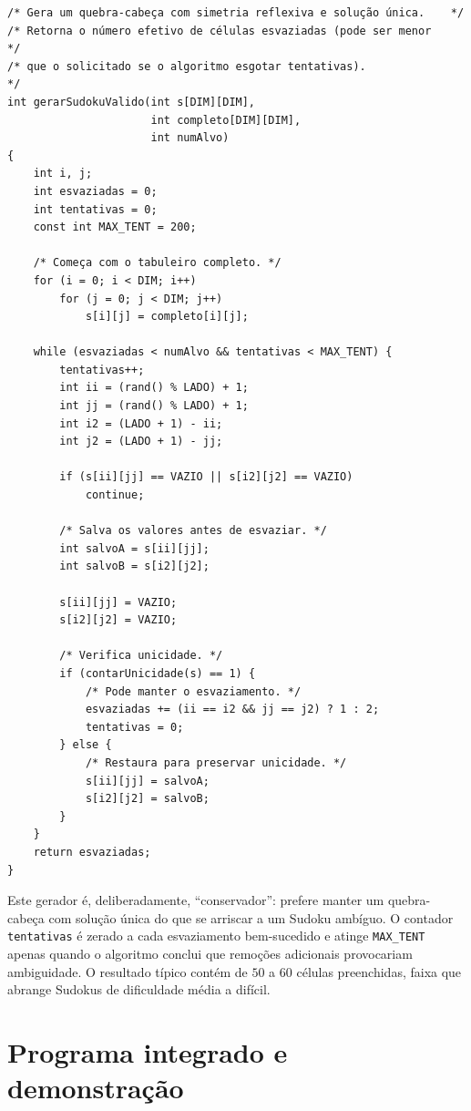\documentclass[11pt,a4paper,oneside]{report}
\newcommand{\codigo}[1]{\texttt{\color{deitelblue}#1}}
\begin{document}
\begin{lstlisting}[caption={Gerador de Sudokus com solução única garantida.},label={lst:gerador_unico}]
/* Gera um quebra-cabeça com simetria reflexiva e solução única.    */
/* Retorna o número efetivo de células esvaziadas (pode ser menor    */
/* que o solicitado se o algoritmo esgotar tentativas).               */
int gerarSudokuValido(int s[DIM][DIM],
                      int completo[DIM][DIM],
                      int numAlvo)
{
    int i, j;
    int esvaziadas = 0;
    int tentativas = 0;
    const int MAX_TENT = 200;

    /* Começa com o tabuleiro completo. */
    for (i = 0; i < DIM; i++)
        for (j = 0; j < DIM; j++)
            s[i][j] = completo[i][j];

    while (esvaziadas < numAlvo && tentativas < MAX_TENT) {
        tentativas++;
        int ii = (rand() % LADO) + 1;
        int jj = (rand() % LADO) + 1;
        int i2 = (LADO + 1) - ii;
        int j2 = (LADO + 1) - jj;

        if (s[ii][jj] == VAZIO || s[i2][j2] == VAZIO)
            continue;

        /* Salva os valores antes de esvaziar. */
        int salvoA = s[ii][jj];
        int salvoB = s[i2][j2];

        s[ii][jj] = VAZIO;
        s[i2][j2] = VAZIO;

        /* Verifica unicidade. */
        if (contarUnicidade(s) == 1) {
            /* Pode manter o esvaziamento. */
            esvaziadas += (ii == i2 && jj == j2) ? 1 : 2;
            tentativas = 0;
        } else {
            /* Restaura para preservar unicidade. */
            s[ii][jj] = salvoA;
            s[i2][j2] = salvoB;
        }
    }
    return esvaziadas;
}
\end{lstlisting}

\begin{desempenho}
Este gerador é, deliberadamente, ``conservador'': prefere manter um
quebra-cabeça com solução única do que se arriscar a um Sudoku ambíguo.
O contador \codigo{tentativas} é zerado a cada esvaziamento bem-sucedido
e atinge \codigo{MAX\_TENT} apenas quando o algoritmo conclui que
remoções adicionais provocariam ambiguidade. O resultado típico contém
de $50$ a $60$ células preenchidas, faixa que abrange Sudokus de
dificuldade média a difícil.
\end{desempenho}

\section{Programa integrado e demonstração}
\end{document}
